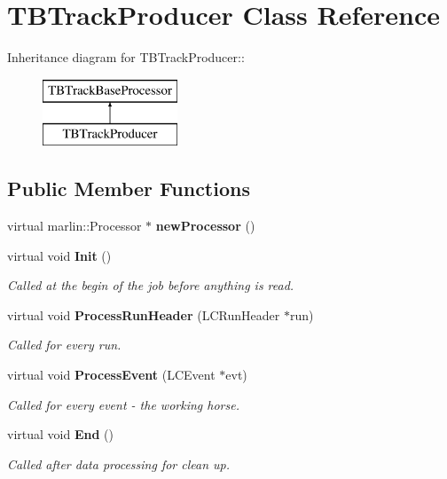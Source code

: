 \section{TBTrackProducer Class Reference}
\label{classTBTrackProducer}
Inheritance diagram for TBTrackProducer::\begin{figure}[H]
\begin{center}
\leavevmode
\includegraphics[height=2cm]{classTBTrackProducer}
\end{center}
\end{figure}
\subsection*{Public Member Functions}
\begin{DoxyCompactItemize}
\item 
virtual marlin::Processor $\ast$ {\bfseries newProcessor} ()\label{classTBTrackProducer_a5159c5af2b5661e0e0a7bfc7591217a9}

\item 
virtual void {\bf Init} ()\label{classTBTrackProducer_a261213eb92718b68b315253b056be414}

\begin{DoxyCompactList}\small\item\em Called at the begin of the job before anything is read. \item\end{DoxyCompactList}\item 
virtual void {\bf ProcessRunHeader} (LCRunHeader $\ast$run)\label{classTBTrackProducer_ac8c608a27e729c78ced0ec8b1969ca24}

\begin{DoxyCompactList}\small\item\em Called for every run. \item\end{DoxyCompactList}\item 
virtual void {\bf ProcessEvent} (LCEvent $\ast$evt)\label{classTBTrackProducer_a4aabdb65ff27029731aa3ce567ed528c}

\begin{DoxyCompactList}\small\item\em Called for every event -\/ the working horse. \item\end{DoxyCompactList}\item 
virtual void {\bf End} ()\label{classTBTrackProducer_a0294d07e812929d30d0797a15de7958b}

\begin{DoxyCompactList}\small\item\em Called after data processing for clean up. \item\end{DoxyCompactList}\end{DoxyCompactItemize}
